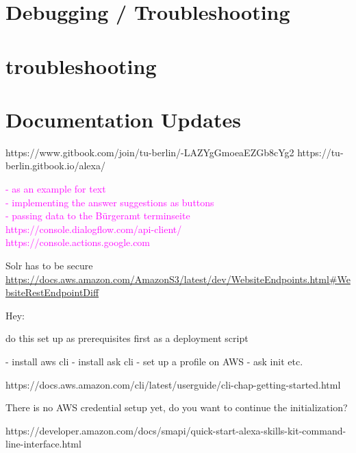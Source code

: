 
\section{Debugging / Troubleshooting}


\section{troubleshooting}



\section{Documentation Updates}
https://www.gitbook.com/join/tu-berlin/-LAZYgGmoeaEZGb8cYg2
https://tu-berlin.gitbook.io/alexa/

\textcolor{magenta}{
- as an example for text\\
- implementing the answer suggestions as buttons\\
- passing data to the Bürgeramt terminseite\\
https://console.dialogflow.com/api-client/ \\
https://console.actions.google.com
}


Solr has to be secure
\url{https://docs.aws.amazon.com/AmazonS3/latest/dev/WebsiteEndpoints.html#WebsiteRestEndpointDiff}


Hey:

do this set up as prerequisites first
as a deployment script

- install aws cli
- install ask cli
- set up a profile on AWS
- ask init etc.

https://docs.aws.amazon.com/cli/latest/userguide/cli-chap-getting-started.html

There is no AWS credential setup yet, do you want to continue the initialization?

https://developer.amazon.com/docs/smapi/quick-start-alexa-skills-kit-command-line-interface.html



























